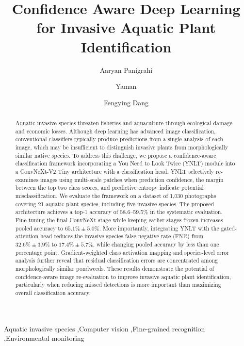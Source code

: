 \documentclass[final,3p,times,twocolumn]{elsarticle}
\begin{document}
\begin{frontmatter}

\title{Confidence Aware Deep Learning for Invasive Aquatic Plant Identification}


\author[label1]{Aaryan Panigrahi}
\author[label1]{Yaman}
\author[label1]{Fengying Dang}


\address{Fengying Dang (fdang1@mtu.edu) is the corresponding author}
\address[label1]{Department of Electrical and Computer Engineering, Michigan Technological University, Houghton, MI 49931, USA}


\begin{abstract}
Aquatic invasive species threaten fisheries and aquaculture through ecological damage and economic losses. Although deep learning has advanced image classification, conventional classifiers typically produce predictions from a single analysis of each image, which may be insufficient to distinguish invasive plants from morphologically similar native species. To address this challenge, we propose a confidence-aware classification framework incorporating a You Need to Look Twice (YNLT) module into a ConvNeXt-V2 Tiny architecture with a classification head. YNLT selectively re-examines images using multi-scale patches when prediction confidence, the margin between the top two class scores, and predictive entropy indicate potential misclassification. We evaluate the framework on a dataset of 1,030 photographs covering 21 aquatic plant species, including five invasive species. The proposed architecture achieves a top-1 accuracy of 58.6--59.5\% in the systematic evaluation. Fine-tuning the final ConvNeXt stage while keeping earlier stages frozen increases pooled accuracy to \(65.1\% \pm 5.0\%\). More importantly, integrating YNLT with the gated-attention head reduces the invasive species false negative rate (FNR) from \(32.6\% \pm 3.9\%\) to \(17.4\% \pm 5.7\%\), while changing pooled accuracy by less than one percentage point. Gradient-weighted class activation mapping and species-level error analysis further reveal that residual classification errors are concentrated among morphologically similar pondweeds. These results demonstrate the potential of confidence-aware image re-evaluation to improve invasive aquatic plant identification, particularly when reducing missed detections is more important than maximizing overall classification accuracy.
\end{abstract}

\begin{keyword}
Aquatic invasive species \sep Computer vision \sep Fine-grained recognition \sep Environmental monitoring
\end{keyword}

\end{frontmatter}
\end{document}
